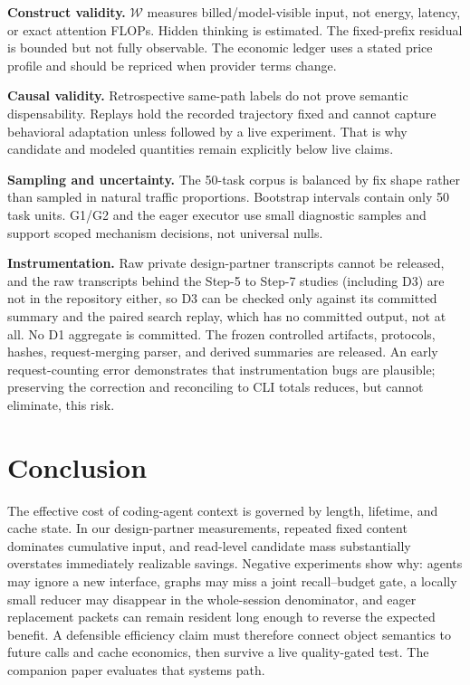 \documentclass[10pt,twocolumn]{article}
\begin{document}
\textbf{Construct validity.}  $\mathcal{W}$ measures billed/model-visible input, not energy, latency,
or exact attention FLOPs.  Hidden thinking is estimated.  The fixed-prefix residual is bounded but
not fully observable.  The economic ledger uses a stated price profile and should be repriced when
provider terms change.

\textbf{Causal validity.}  Retrospective same-path labels do not prove semantic dispensability.
Replays hold the recorded trajectory fixed and cannot capture behavioral adaptation unless followed
by a live experiment.  That is why candidate and modeled quantities remain explicitly below live
claims.

\textbf{Sampling and uncertainty.}  The 50-task corpus is balanced by fix shape rather than sampled
in natural traffic proportions.  Bootstrap intervals contain only 50 task units.  G1/G2 and the eager
executor use small diagnostic samples and support scoped mechanism decisions, not universal nulls.

\textbf{Instrumentation.}  Raw private design-partner transcripts cannot be released, and the raw
transcripts behind the Step-5 to Step-7 studies (including D3) are not in the repository either, so
D3 can be checked only against its committed summary and the paired search replay, which has no
committed output, not at all.  No D1 aggregate is committed.  The frozen controlled artifacts,
protocols, hashes, request-merging parser, and derived summaries are released.  An early
request-counting error demonstrates that instrumentation bugs are plausible; preserving the
correction and reconciling to CLI totals reduces, but cannot eliminate, this risk.

\section{Conclusion}

The effective cost of coding-agent context is governed by length, lifetime, and cache state.  In our
design-partner measurements, repeated fixed content dominates cumulative input, and read-level
candidate mass substantially overstates immediately realizable savings.  Negative experiments show
why: agents may ignore a new interface, graphs may miss a joint recall--budget gate, a locally small
reducer may disappear in the whole-session denominator, and eager replacement packets can remain
resident long enough to reverse the expected benefit.  A defensible efficiency claim must therefore
connect object semantics to future calls and cache economics, then survive a live quality-gated test.
The companion paper evaluates that systems path.
\end{document}
